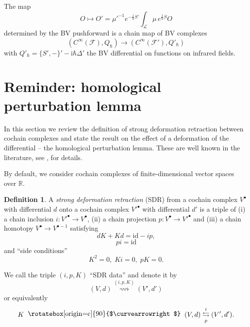 \documentclass{amsart}
\theoremstyle{plain} %
\theoremstyle{definition}
\newtheorem{defn}[thm]{Definition}
\theoremstyle{remark}
\newcommand{\mr}{\mathrm}
\newcommand{\bt}{\bullet}
\newcommand{\ra}{\rightarrow}
\newcommand{\F}{\mathcal{F}}
\newcommand{\LL}{\mathcal{L}}
\newcommand{\iii}{\mathrm{i}}
\newcommand{\SDR}[5]{#5\;\;\raisebox{1.3pt}{\rotatebox[origin=c]{90}{$\curvearrowright$}}\;\; #1 \underset{#4}{\stackrel{#3}{\leftrightarrows}} #2}  %
\begin{document}
The map
\begin{equation}\label{map O to O'}
O\mapsto O'=\mu'^{-1}e^{-\frac{\iii}{\hbar}S'}\int_\LL \mu\,e^{\frac{\iii}{\hbar}S} O
\end{equation} 
determined by the BV pushforward is a chain map of BV complexes
\begin{equation}
    (C^\infty(\F), Q_\hbar) \ra (C^\infty(\F'),Q'_\hbar)
\end{equation}
with $Q'_\hbar=\{S',-\}'-\iii\hbar\Delta'$ the BV differential on functions on infrared fields.


\section{Reminder: homological perturbation lemma}
\label{sec: HPL}

In this section we review the definition of strong deformation retraction between cochain complexes and state the result on the effect of a deformation of the differential -- the homological perturbation lemma. These are well known in the literature, see \cite{GL}, \cite{Crainic} for details. 

By default, we consider cochain complexes of finite-dimensional vector spaces over $\mathbb{R}$.

\begin{defn}
A \emph{strong deformation retraction} (SDR) from a cochain complex $V^\bt$ with differential $d$ onto a cochain complex $V'^{\bt}$ with differential $d'$ is a triple of (i) a chain inclusion $i\colon V'^{\bt}\ra V^\bt$, (ii) a chain projection $p\colon V^\bt\ra V'^{\bt}$ and (iii) a chain homotopy $V^\bt\ra V^{\bt-1}$ satisfying
\begin{equation}\label{dK+Kd=id-ip}
    dK+Kd=\mr{id}-ip,
\end{equation}
\begin{equation}
    pi =\mr{id}
\end{equation}
and ``side conditions''
\begin{equation}\label{side conditions}
    K^2=0,\; Ki=0,\; pK=0.
\end{equation}
\end{defn}
We call the triple $(i,p,K)$ ``SDR data'' and denote it by %
\begin{equation}\label{ipK squiggly notation}
    (V,d)\stackrel{(i,p,K)}{\rightsquigarrow} (V',d')
\end{equation}
or equivalently
\begin{equation}\label{ipK}
    \SDR{(V,d)}{(V',d')}{i}{p}{K}.
\end{equation}
\end{document}
